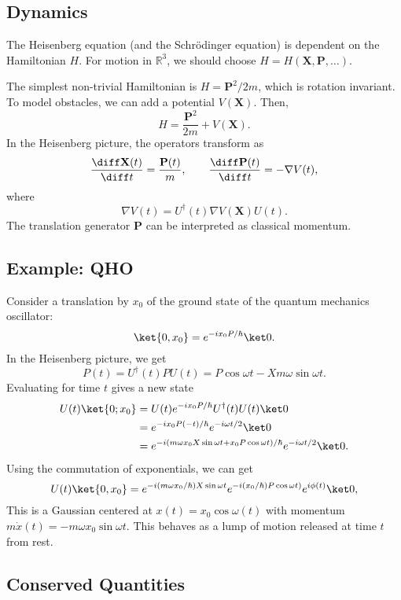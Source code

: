 \documentclass[12pt]{article}
\begin{document}
\subsection{Dynamics}
\label{sub:dynamics}

The Heisenberg equation (and the Schr\"odinger equation) is dependent on the Hamiltonian $H$. For motion in $\mathbb{R}^3$, we should choose $H = H(\mathbf{X}, \mathbf{P}, \ldots)$.

The simplest non-trivial Hamiltonian is $H = \mathbf{P}^2/2m$, which is rotation invariant. To model obstacles, we can add a potential $V(\mathbf{X})$. Then,
\[
H = \frac{\mathbf{P}^2}{2m} + V(\mathbf{X}).
\]
In the Heisenberg picture, the operators transform as
\[
\frac{\diff \mathbf{X}(t)}{\diff t} = \frac{\mathbf{P}(t)}{m}, \qquad \frac{\diff \mathbf{P}(t)}{\diff t} = - \nabla V(t),
\]
where
\[
\nabla V(t) = U^{\dagger}(t) \nabla V(\mathbf{X}) U(t).
\]
The translation generator $\mathbf{P}$ can be interpreted as classical momentum.

\subsection{Example: QHO}
\label{sub:ex_qmo}

Consider a translation by $x_0$ of the ground state of the quantum mechanics oscillator:
\[
	\ket{0,x_0} = e^{-ix_0 P/\hbar}\ket 0.
\]
In the Heisenberg picture, we get
\[
P(t) = U^{\dagger}(t) P U(t) = P \cos \omega t - X m \omega \sin \omega t.
\]
Evaluating for time $t$ gives a new state
\begin{align*}
	U(t) \ket{0;x_0} &= U(t) e^{-i x_0 P/\hbar} U^{\dagger}(t) U(t) \ket 0 \\
			 &= e^{-i x_0 P(-t)/\hbar} e^{-i\omega t/2} \ket 0 \\
			 &= e^{-i(m\omega x_0 X \sin \omega t + x_0 P \cos \omega t)/\hbar} e^{-i \omega t/2} \ket 0.
\end{align*}
Using the commutation of exponentials, we can get
\[
	U(t) \ket{0, x_0} = e^{-i(m\omega x_0/\hbar)X \sin \omega t} e^{-i(x_0/\hbar) P \cos \omega t)} e^{i \phi(t)} \ket 0,
\]
This is a Gaussian centered at $x(t) = x_0 \cos \omega(t)$ with momentum $m \dot x(t) = - m \omega x_0 \sin \omega t$. This behaves as a lump of motion released at time $t$ from rest.

\subsection{Conserved Quantities}
\label{sub:conserved_qs}
\end{document}
